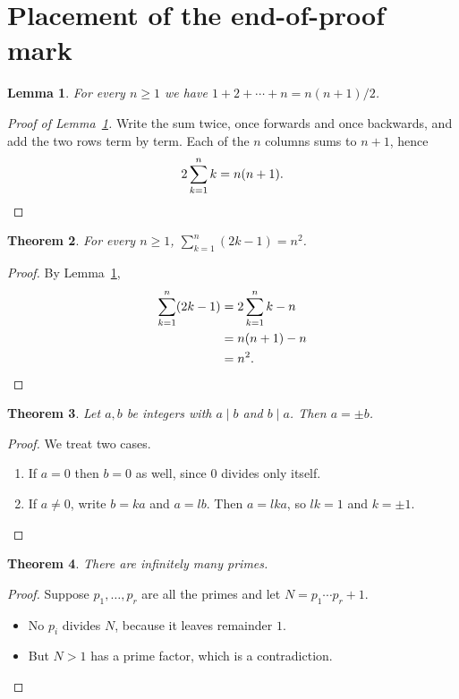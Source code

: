\documentclass[11pt]{article}
\newtheorem{theorem}{Theorem}
\newtheorem{lemma}[theorem]{Lemma}
\begin{document}
\section*{Placement of the end-of-proof mark}

\begin{lemma}\label{lem:sum}
For every $n \ge 1$ we have $1 + 2 + \cdots + n = n(n+1)/2$.
\end{lemma}

\begin{proof}[Proof of Lemma~\ref{lem:sum}]
Write the sum twice, once forwards and once backwards, and add the two rows
term by term. Each of the $n$ columns sums to $n+1$, hence
\[
  2\sum_{k=1}^{n} k = n(n+1). \qedhere
\]
\end{proof}

\begin{theorem}\label{thm:sq}
For every $n \ge 1$, $\sum_{k=1}^{n} (2k-1) = n^2$.
\end{theorem}

\begin{proof}
By Lemma~\ref{lem:sum},
\begin{align*}
  \sum_{k=1}^{n} (2k-1) &= 2\sum_{k=1}^{n} k - n \\
                        &= n(n+1) - n \\
                        &= n^2. \qedhere
\end{align*}
\end{proof}

\begin{theorem}
Let $a, b$ be integers with $a \mid b$ and $b \mid a$. Then $a = \pm b$.
\end{theorem}

\begin{proof}
We treat two cases.
\begin{enumerate}
  \item If $a = 0$ then $b = 0$ as well, since $0$ divides only itself.
  \item If $a \neq 0$, write $b = ka$ and $a = lb$. Then $a = lka$, so
        $lk = 1$ and $k = \pm 1$. \qedhere
\end{enumerate}
\end{proof}

\begin{theorem}
There are infinitely many primes.
\end{theorem}

\begin{proof}
Suppose $p_1, \dots, p_r$ are all the primes and let $N = p_1 \cdots p_r + 1$.
\begin{itemize}
  \item No $p_i$ divides $N$, because it leaves remainder $1$.
  \item But $N > 1$ has a prime factor, which is a contradiction. \qedhere
\end{itemize}
\end{proof}
\end{document}
